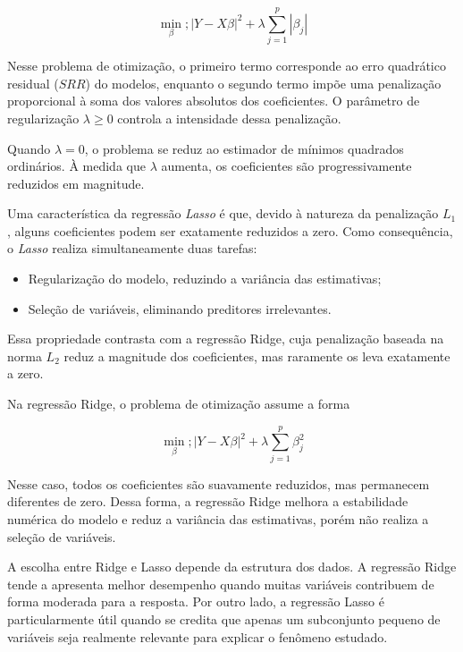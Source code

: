 \documentclass{article}
\begin{document}
\begin{equation}
    \min_{\beta}; |Y - X\beta|^2 + \lambda \sum_{j=1}^{p} |\beta_j|
\end{equation}

Nesse problema de otimização, o primeiro termo corresponde ao erro 
quadrático residual ($SRR$) do modelos, enquanto o segundo termo 
impõe uma penalização proporcional à soma dos valores absolutos 
dos coeficientes. O parâmetro de regularização $\lambda \geq 0$ 
controla a intensidade dessa penalização. 

Quando $\lambda = 0$, o problema se reduz ao estimador de mínimos 
quadrados ordinários. À medida que $\lambda$ aumenta, os coeficientes 
são progressivamente reduzidos em magnitude.

Uma característica da regressão \textit{Lasso} é que, devido à 
natureza da penalização $L_1$, alguns coeficientes podem ser 
exatamente reduzidos a zero. Como consequência, o \textit{Lasso} 
realiza simultaneamente duas tarefas:

\begin{itemize}
    \item Regularização do modelo, reduzindo a variância das estimativas;
    \item Seleção de variáveis, eliminando preditores irrelevantes.
\end{itemize}

Essa propriedade contrasta com a regressão Ridge, cuja penalização
baseada na norma $L_2$ reduz a magnitude dos coeficientes, mas 
raramente os leva exatamente a zero. 

Na regressão Ridge, o problema de otimização assume a forma 

\begin{equation*}
    \min_{\beta}; |Y - X\beta|^2 + \lambda \sum_{j=1}^{p} \beta_j^2
\end{equation*}

Nesse caso, todos os coeficientes são suavamente reduzidos, 
mas permanecem diferentes de zero. Dessa forma, a regressão 
Ridge melhora a estabilidade numérica do modelo e reduz a variância 
das estimativas, porém não realiza a seleção de variáveis.

A escolha entre Ridge e Lasso depende da estrutura dos dados. A regressão
Ridge tende a apresenta melhor desempenho quando muitas variáveis contribuem 
de forma moderada para a resposta. Por outro lado, a regressão Lasso 
é particularmente útil quando se credita que apenas um subconjunto pequeno 
de variáveis seja realmente relevante para explicar o fenômeno estudado. 
\end{document}
